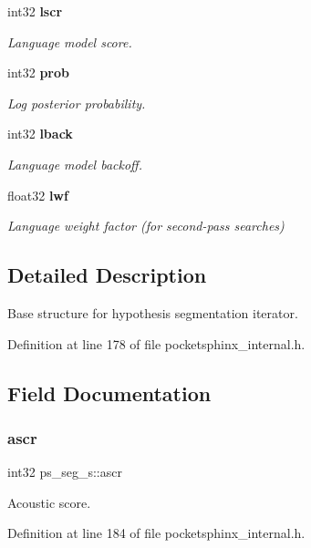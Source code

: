\begin{DoxyCompactItemize}
int32 \textbf{ lscr}
\begin{DoxyCompactList}\small\item\em Language model score. \end{DoxyCompactList}\item 
int32 \textbf{ prob}
\begin{DoxyCompactList}\small\item\em Log posterior probability. \end{DoxyCompactList}\item 
int32 \textbf{ lback}
\begin{DoxyCompactList}\small\item\em Language model backoff. \end{DoxyCompactList}\item 
\mbox{\label{structps__seg__s_a2249c012b83c902f4f8ed8d98ded7d20}} 
float32 \textbf{ lwf}
\begin{DoxyCompactList}\small\item\em Language weight factor (for second-\/pass searches) \end{DoxyCompactList}\end{DoxyCompactItemize}


\subsection{Detailed Description}
Base structure for hypothesis segmentation iterator. 

Definition at line 178 of file pocketsphinx\+\_\+internal.\+h.



\subsection{Field Documentation}
\mbox{\label{structps__seg__s_a6f7706ec4c0d0ec8ecafaf0f29f41f4b}} 
\subsubsection{ascr}
{\footnotesize\ttfamily int32 ps\+\_\+seg\+\_\+s\+::ascr}



Acoustic score. 



Definition at line 184 of file pocketsphinx\+\_\+internal.\+h.



